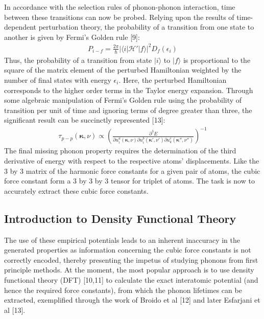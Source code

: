 \documentclass{article}
\numberwithin{equation}{section}
\begin{document}
In accordance with the selection rules of phonon-phonon interaction, time between these transitions can now be probed. Relying upon the results of time-dependent perturbation theory, the probability of a transition from one state to another is given by Fermi's Golden rule [9]:
\begin{align*}
P_{i-f}=\frac{2\pi}{\hbar}|\langle i|\mathscr{H}'|f\rangle|^2 D_f(\epsilon_i)
\end{align*}
Thus, the probability of a transition from state $|i\rangle$ to $|f\rangle$ is proportional to the square of the matrix element of the perturbed Hamiltonian weighted by the number of final states with energy $\epsilon_i$. Here, the perturbed Hamiltonian corresponds to the higher order terms in the Taylor energy expansion. Through some algebraic manipulation of Fermi's Golden rule using the probability of transition per unit of time and ignoring terms of degree greater than three, the significant result can be succinctly represented [13]:
\begin{align*}
\tau_{p-p}(\pmb{\kappa},\nu)\propto (\frac{\partial^3 E}{\partial u^a_i(\pmb{\kappa},\nu)\partial u^b_i(\pmb{\kappa'},\nu')\partial u^c_k(\pmb{\kappa''},\nu'')})^{-1}
\end{align*}
The final missing phonon property requires the determination of the third derivative of energy with respect to the respective atoms' displacements. Like the 3 by 3 matrix of the harmonic force constants for a given pair of atoms, the cubic force constant form a 3 by 3 by 3 tensor for triplet of atoms.  The task is now to accurately extract these cubic force constants.

\subsection{Introduction to Density Functional Theory}
 
The use of these empirical potentials leads to an inherent inaccuracy in the generated properties as information concerning the cubic force constants is not correctly encoded, thereby presenting the impetus of studying phonons from first principle methods. At the moment, the most popular approach is to use density functional theory (DFT) [10,11] to calculate the exact interatomic potential (and hence the required force constants), from which the phonon lifetimes can be extracted, exemplified through the work of Broido et al [12] and later Esfarjani et al [13].
\end{document}
